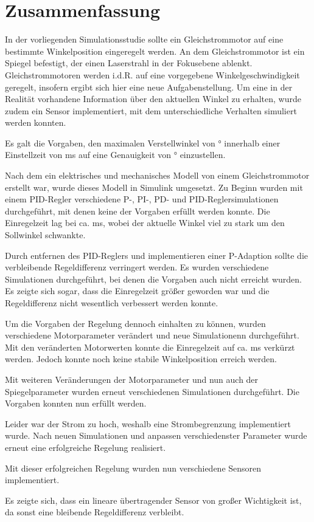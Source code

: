 \newpage




\chapter{Zusammenfassung}
\label{chap:Zusammenfassung}
In der vorliegenden Simulationsstudie sollte ein Gleichstrommotor auf eine bestimmte Winkelposition eingeregelt werden.
An dem Gleichstrommotor ist ein Spiegel befestigt, der einen Laserstrahl in der Fokusebene ablenkt.
Gleichstrommotoren werden i.d.R. auf eine vorgegebene Winkelgeschwindigkeit geregelt, insofern ergibt sich hier eine neue Aufgabenstellung.
Um eine in der Realität vorhandene Information über den aktuellen Winkel zu erhalten, wurde zudem ein Sensor implementiert, mit dem unterschiedliche Verhalten simuliert 
werden konnten.

Es galt die Vorgaben, den maximalen Verstellwinkel von \unit[20]{°} innerhalb einer Einstellzeit von \unit[1]{ms} auf eine Genauigkeit von \unit[1e-3]{°} einzustellen.

Nach dem ein elektrisches und mechanisches Modell von einem Gleichstrommotor erstellt war, wurde dieses Modell in Simulink umgesetzt.
Zu Beginn wurden mit einem PID-Regler verschiedene P-, PI-, PD- und PID-Reglersimulationen durchgeführt, mit denen keine der Vorgaben erfüllt werden konnte.
Die Einregelzeit lag bei ca. \unit[6]{ms}, wobei der aktuelle Winkel viel zu stark um den Sollwinkel schwankte.

Durch entfernen des PID-Reglers und implementieren einer P-Adaption sollte die verbleibende Regeldifferenz verringert werden.
Es wurden verschiedene Simulationen durchgeführt, bei denen die Vorgaben auch nicht erreicht wurden.
Es zeigte sich sogar, dass die Einregelzeit größer geworden war und die Regeldifferenz nicht wesentlich verbessert werden konnte.

Um die Vorgaben der Regelung dennoch einhalten zu können, wurden verschiedene Motorparameter verändert und neue Simulationenn durchgeführt.
Mit den veränderten Motorwerten konnte die Einregelzeit auf ca. \unit[2]{ms} verkürzt werden.
Jedoch konnte noch keine stabile Winkelposition erreich werden.

Mit weiteren Veränderungen der Motorparameter und nun auch der Spiegelparameter wurden erneut verschiedenen Simulationen durchgeführt.
Die Vorgaben konnten nun erfüllt werden.

Leider war der Strom zu hoch, weshalb eine Strombegrenzung implementiert wurde.
Nach neuen Simulationen und anpassen verschiedenster Parameter wurde erneut eine erfolgreiche Regelung realisiert.

Mit dieser erfolgreichen Regelung wurden nun verschiedene Sensoren implementiert.

Es zeigte sich, dass ein lineare übertragender Sensor von großer Wichtigkeit ist, da sonst eine bleibende Regeldifferenz verbleibt.
